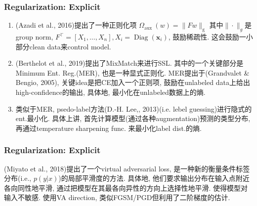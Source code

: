 \documentclass{beamer}
\newcommand{\bs}[1]{\boldsymbol{#1}}
\begin{document}
\begin{frame}
    \frametitle{Regularization: Explicit}

    \begin{enumerate}
        \item (Azadi et al., 2016)提出了一种正则化项
        $\Omega_{\text {aux }}(w)=\|F w\|_{\mathrm{g}}$
        其中$\|\cdot\|_{g}$是group norm,
        $F^{\top}=\left[X_{1}, \ldots, X_{n}\right], X_i=\operatorname{Diag}(\bs x_i)$,
        鼓励稀疏性. 这会鼓励一小部分clean data来control model.
        \item (Berthelot et al., 2019)提出了MixMatch来进行SSL. 其中的一个关键部分是Minimum Ent. Reg.(MER), 也是一种显式正则化. MER提出于(Grandvalet \&  Bengio, 2005), 关键idea是把CE加入一个正则项, 鼓励在unlabeled data上给出high-confidence的输出, 具体地, 最小化在unlabeled数据上的熵.
        \item 类似于MER, psedo-label方法(D.-H.   Lee,, 2013)(i.e. lebel guessing)进行隐式的ent.最小化. 具体上讲, 首先计算模型(通过各种augmentation)预测的类型分布, 再通过temperature sharpening func. 来最小化label dist.的熵.
    \end{enumerate}

\end{frame}

\begin{frame}
    \frametitle{Regularization: Explicit}

    (Miyato et al., 2018)提出了一个virtual adversarial loss, 是一种新的衡量条件标签分布(i.e., $p(y|x)$)的局部平滑度的方法. 具体地, 他们要求输出分布在输入点附近各向同性地平滑, 通过把模型在其最各向异性的方向上选择性地平滑. 使得模型对输入不敏感. 使用VA direction, 类似FGSM/PGD但利用了二阶梯度的估计.

\end{frame}
\end{document}
